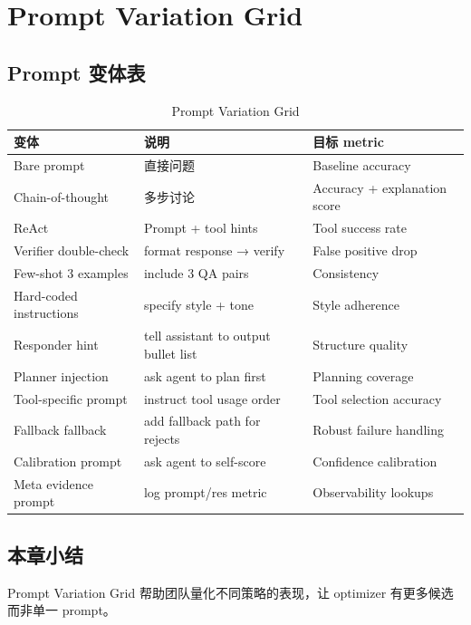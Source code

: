 \section{Prompt Variation Grid}

\subsection{Prompt 变体表}

\begin{table}[H]
\centering
\caption{Prompt Variation Grid}
\begin{tabular}{p{}p{}p{}}
\toprule
变体 & 说明 & 目标 metric \\
\midrule
Bare prompt & 直接问题 & Baseline accuracy \\
Chain-of-thought & 多步讨论 & Accuracy + explanation score \\
ReAct & Prompt + tool hints & Tool success rate \\
Verifier double-check & format response → verify & False positive drop \\
Few-shot 3 examples & include 3 QA pairs & Consistency \\
Hard-coded instructions & specify style + tone & Style adherence \\
Responder hint & tell assistant to output bullet list & Structure quality \\
Planner injection & ask agent to plan first & Planning coverage \\
Tool-specific prompt & instruct tool usage order & Tool selection accuracy \\
Fallback fallback & add fallback path for rejects & Robust failure handling \\
Calibration prompt & ask agent to self-score & Confidence calibration \\
Meta evidence prompt & log prompt/res metric & Observability lookups \\
\bottomrule
\end{tabular}
\end{table}

\subsection{本章小结}

Prompt Variation Grid 帮助团队量化不同策略的表现，让 optimizer 有更多候选而非单一 prompt。

